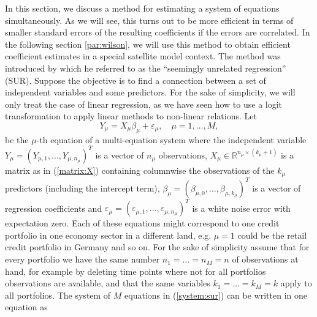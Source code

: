 \documentclass[a4paper, 12pt]{scrreprt}
\newcommand{\RR}{\mathbb{R}}
\begin{document}
In this section, we discuss a method for estimating a system of equations simultaneously. As we will see, this turns out to be more efficient in terms of smaller standard errors of the resulting coefficients if the errors are correlated. 
In the following section \ref{par:wilson}, we will use this method to obtain efficient coefficient estimates in a special satellite model context.
The method was introduced by \textcite{zellner1962efficient} which he referred to as the ``seemingly unrelated regression'' (SUR). 
Suppose the objective is to find a connection between a set of independent variables and some predictors. For the sake of simplicity, we will only treat the case of linear regression, as we have seen how to use a logit transformation to apply linear methods to non-linear relations.
Let 
\begin{equation}\label{system:sur}
 Y_\mu = X_\mu \beta_\mu + \varepsilon_\mu, \quad \mu = 1,\ldots,M,
\end{equation}
be the $\mu$-th equation of a multi-equation system where the independent variable \linebreak 
$Y_\mu = (Y_{\mu,1}, \ldots, Y_{\mu,n_\mu})^T$ is a vector of $n_\mu$ observations, $X_\mu \in \RR^{n_\mu \times (k_\mu +1)}$ is a matrix as in (\ref{matrix:X}) containing columnwise the observations of the $k_\mu$ predictors (including the intercept term), $\beta_\mu = (\beta_{\mu,0}, \ldots, \beta_{\mu,k_\mu})^T$ is a vector of regression coefficients and
$\varepsilon_\mu = (\varepsilon_{\mu,1}, \ldots, \varepsilon_{\mu,n_\mu})^T$ is a white noise error with expectation zero.
Each of these equations might correspond to one credit portfolio in one economy sector in a different land, e.g. $\mu = 1$ could be the retail credit portfolio in Germany and so on. 
For the sake of simplicity assume that for every portfolio we have the same number $n_1 = \ldots = n_M = n$ of observations at hand, for example by deleting time points where not for all portfolios observations are available, and that the same variables $k_1 = \ldots = k_M = k$ apply to all portfolios.
The system of $M$ equations in (\ref{system:sur}) can be written in one equation as
\end{document}
